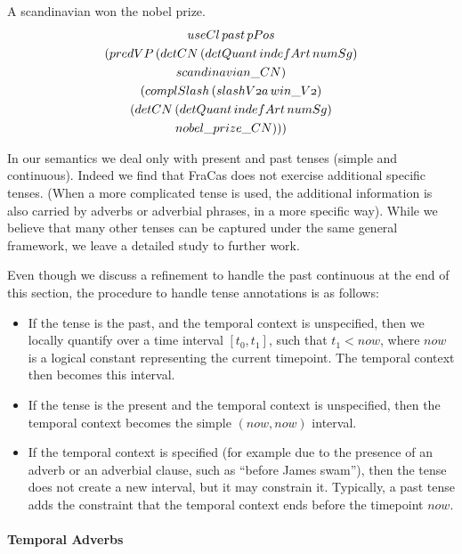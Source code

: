 \documentclass[a4paper,twoside]{article}
\newcommand\onelingex[1]{\begin{lingex}\item #1 \end{lingex}}
\begin{document}
\onelingex{A scandinavian won the nobel prize.\label{ex:nobel}
\\
{\small\begin{multline*}
\mathnormal{useCl}\, \mathnormal{past}\, \mathnormal{pPos}\\ (\mathnormal{predVP}\, (\mathnormal{detCN}\, (\mathnormal{detQuant}\, \mathnormal{indefArt}\, \mathnormal{numSg})\\ \mathnormal{scandinavian\_CN})\\ (\mathnormal{complSlash}\, (\mathnormal{slashV2a}\, \mathnormal{win\_V2})\\ (\mathnormal{detCN}\, (\mathnormal{detQuant}\, \mathnormal{indefArt}\, \mathnormal{numSg})\\ \mathnormal{nobel\_prize\_CN})))
\end{multline*}
}}
%
In our semantics we deal only with present and past tenses (simple and
continuous). Indeed we find that FraCas does not exercise additional
specific tenses. (When a more complicated tense is used, the
additional information is also carried by adverbs or adverbial
phrases, in a more specific way). While we believe that many other
tenses can be captured under the same general framework, we leave a
detailed study to further work.

Even though we discuss a refinement to handle the past continuous
at the end of this section, the procedure to handle tense annotations
is as follows:
\begin{itemize}
\item If the tense is the past, and the temporal context is
  unspecified, then we locally quantify over a time interval
  $[t_0,t_1]$, such that $t_1 < now$, where $now$ is a logical
  constant representing the current timepoint. The temporal context
  then becomes this interval.
\item If the tense is the present and the temporal context is
  unspecified, then the temporal context becomes the simple
  $(now,now)$ interval.
\item If the temporal context is specified (for example due to the presence of an adverb or an
  adverbial clause, such as ``before James swam''), then the tense does
  not create a new interval, but it may constrain it. Typically, a
  past tense adds the constraint that the temporal context ends before
  the timepoint $now$.
\end{itemize}

\paragraph{Temporal Adverbs}
\end{document}
